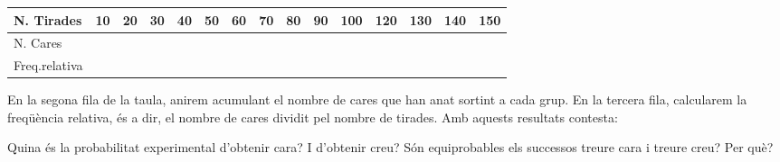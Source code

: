 \begin{mylist}
\begin{longtable}{|p{0.7in}|p{0.2in}|p{0.2in}|p{0.2in}|p{0.2in}|p{0.2in}|p{0.2in}|p{0.2in}|p{0.2in}|p{0.2in}|p{0.2in}|p{0.2in}|p{0.2in}|p{0.2in}|p{0.2in}|} \hline 
N. Tirades & 10 & 20 & 30 & 40 & 50 & 60 & 70 & 80 & 90 & 100 & 120 & 130 & 140 & 150 \\ \hline 
N. Cares &  &  &  &  &  &  &  &  &  &  &  &  &  &  \\ \hline 
Freq.\newline relativa &  &  &  &  &  &  &  &  &  &  &  &  &  &  \\ \hline 
\end{longtable}
  En la segona fila de la taula, anirem acumulant el nombre de cares que han anat sortint a cada grup. En la tercera fila, calcularem la freqüència relativa, és a dir, el nombre de cares dividit pel nombre de tirades. Amb aquests resultats contesta:
\begin{tasks} 
\task Quina és la probabilitat experimental d'obtenir cara? I d'obtenir creu?
\task Són equiprobables els successos treure cara i treure creu? Per què?
\end{tasks}



\end{mylist}
